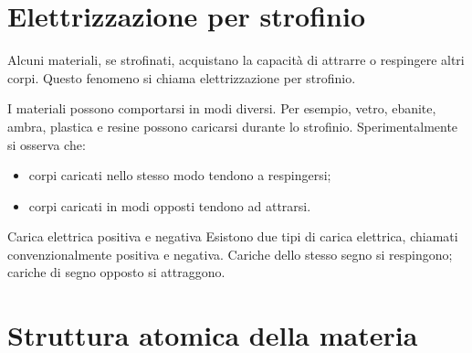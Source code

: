 \documentclass[a4paper]{article}
\begin{document}
\section{Elettrizzazione per strofinio}

Alcuni materiali, se strofinati, acquistano la capacità di attrarre o respingere altri corpi. Questo fenomeno si chiama elettrizzazione per strofinio.

I materiali possono comportarsi in modi diversi. Per esempio, vetro, ebanite, ambra, plastica e resine possono caricarsi durante lo strofinio. Sperimentalmente si osserva che:
\begin{itemize}
    \item corpi caricati nello stesso modo tendono a respingersi;
    \item corpi caricati in modi opposti tendono ad attrarsi.
\end{itemize}

\begin{snippetdefinition}{Carica elettrica positiva e negativa}
    Esistono due tipi di carica elettrica, chiamati convenzionalmente positiva e negativa. Cariche dello stesso segno si respingono; cariche di segno opposto si attraggono.
\end{snippetdefinition}

\begin{center}
\end{center}

\section{Struttura atomica della materia}
\end{document}
